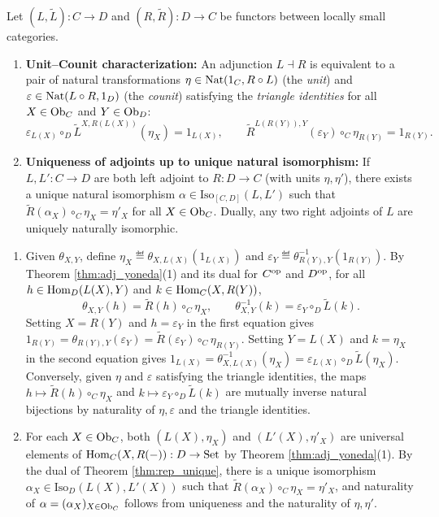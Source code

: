 \documentclass[10pt,a4paper]{article}
\begin{document}
\begin{theorem}\label{thm:triangle_id}
Let $(L, \widetilde{L}) : C \to D$ and $(R, \widetilde{R}) : D \to C$ be functors between locally small categories.
\begin{enumerate}
\item \textbf{Unit--Counit characterization:} An adjunction $L \dashv R$ is equivalent to a pair of natural transformations $\eta \in {\textrm{Nat}}(1_C, R \circ L)$ (the \emph{unit}) and $\varepsilon \in {\textrm{Nat}}(L \circ R, 1_D)$ (the \emph{counit}) satisfying the \emph{triangle identities} for all $X \in {\textrm{Ob}}_C$ and $Y \in {\textrm{Ob}}_D$:
$$\varepsilon_{L(X)} \circ_D \widetilde{L}^{X,R(L(X))}(\eta_X) = 1_{L(X)}, \qquad \widetilde{R}^{L(R(Y)),Y}(\varepsilon_Y) \circ_C \eta_{R(Y)} = 1_{R(Y)}.$$
\item \textbf{Uniqueness of adjoints up to unique natural isomorphism:} If $L, L' : C \to D$ are both left adjoint to $R : D \to C$ (with units $\eta, \eta'$), there exists a unique natural isomorphism $\alpha \in \mathrm{Iso}_{[C,D]}(L, L')$ such that $\widetilde{R}(\alpha_X) \circ_C \eta_X = \eta'_X$ for all $X \in {\textrm{Ob}}_C$. Dually, any two right adjoints of $L$ are uniquely naturally isomorphic.
\end{enumerate}
\end{theorem}
\myprf
\begin{enumerate}
\item Given $\theta_{X,Y}$, define $\eta_X \eqdef \theta_{X,L(X)}(1_{L(X)})$ and $\varepsilon_Y \eqdef \theta_{R(Y),Y}^{-1}(1_{R(Y)})$. By Theorem \ref{thm:adj_yoneda}(1) and its dual for $C^{\textrm{op}}$ and $D^{\textrm{op}}$, for all $h \in {\textrm{Hom}}_D(L(X), Y)$ and $k \in {\textrm{Hom}}_C(X, R(Y))$,
$$\theta_{X,Y}(h) = \widetilde{R}(h) \circ_C \eta_X, \qquad \theta_{X,Y}^{-1}(k) = \varepsilon_Y \circ_D \widetilde{L}(k).$$
Setting $X = R(Y)$ and $h = \varepsilon_Y$ in the first equation gives $1_{R(Y)} = \theta_{R(Y),Y}(\varepsilon_Y) = \widetilde{R}(\varepsilon_Y) \circ_C \eta_{R(Y)}$. Setting $Y = L(X)$ and $k = \eta_X$ in the second equation gives $1_{L(X)} = \theta_{X,L(X)}^{-1}(\eta_X) = \varepsilon_{L(X)} \circ_D \widetilde{L}(\eta_X)$. Conversely, given $\eta$ and $\varepsilon$ satisfying the triangle identities, the maps $h \mapsto \widetilde{R}(h) \circ_C \eta_X$ and $k \mapsto \varepsilon_Y \circ_D \widetilde{L}(k)$ are mutually inverse natural bijections by naturality of $\eta, \varepsilon$ and the triangle identities.
\item For each $X \in {\textrm{Ob}}_C$, both $(L(X), \eta_X)$ and $(L'(X), \eta'_X)$ are universal elements of ${\textrm{Hom}}_C(X, R(-)) : D \to {\textrm{Set}}$ by Theorem \ref{thm:adj_yoneda}(1). By the dual of Theorem \ref{thm:rep_unique}, there is a unique isomorphism $\alpha_X \in \mathrm{Iso}_D(L(X), L'(X))$ such that $\widetilde{R}(\alpha_X) \circ_C \eta_X = \eta'_X$, and naturality of $\alpha = (\alpha_X)_{X \in {\textrm{Ob}}_C}$ follows from uniqueness and the naturality of $\eta, \eta'$.
\end{enumerate}
\myqed
\end{document}
